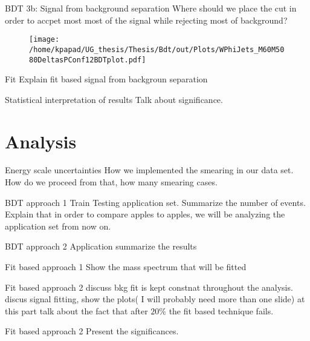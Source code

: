 \documentclass[bigger]{beamer}
\begin{document}
\begin{frame}[label={sec:orgdf84725}]{BDT 3b: Signal from background separation}
Where should we place the cut in order to accpet most most of the  signal while rejecting most of background?
\begin{figure}[hb]
\centering
\texttt{[image: /home/kpapad/UG\_thesis/Thesis/Bdt/out/Plots/WPhiJets\_M60M5080DeltasPConf12BDTplot.pdf]}
\end{figure}
\end{frame}
\begin{frame}[label={sec:org46d629e}]{Fit}
Explain fit based signal from backgroun separation
\end{frame}
\begin{frame}[label={sec:org1e04401}]{Statistical interpretation of results}
Talk about significance.
\end{frame}
\section{Analysis}
\label{sec:org98a9a14}
\begin{frame}[label={sec:orge8bf964}]{Energy scale uncertainties}
How we implemented the smearing in our data set. How do we proceed from that, how many smearing cases. 
\end{frame}
\begin{frame}[label={sec:orgbd72183}]{BDT approach 1}
Train Testing application set. Summarize the number of events. Explain that in order to compare apples to apples, we will be analyzing the application set from now on.
\end{frame}
\begin{frame}[label={sec:org7ca14c4}]{BDT approach 2}
Application summarize the results 
\end{frame}
\begin{frame}[label={sec:org7298663}]{Fit based approach 1}
Show the mass spectrum that will be fitted 
\end{frame}
\begin{frame}[label={sec:orgc72838e}]{Fit based approach 2}
discuss bkg fit is kept constnat throughout the analysis. discus signal fitting, show the plots( I will probably need more than one slide) at this part talk about the fact that after \(20\%\) the fit based technique fails. 
\end{frame}
\begin{frame}[label={sec:org5f5094b}]{Fit based approach 2}
Present the significances.
\end{frame}
\end{document}
